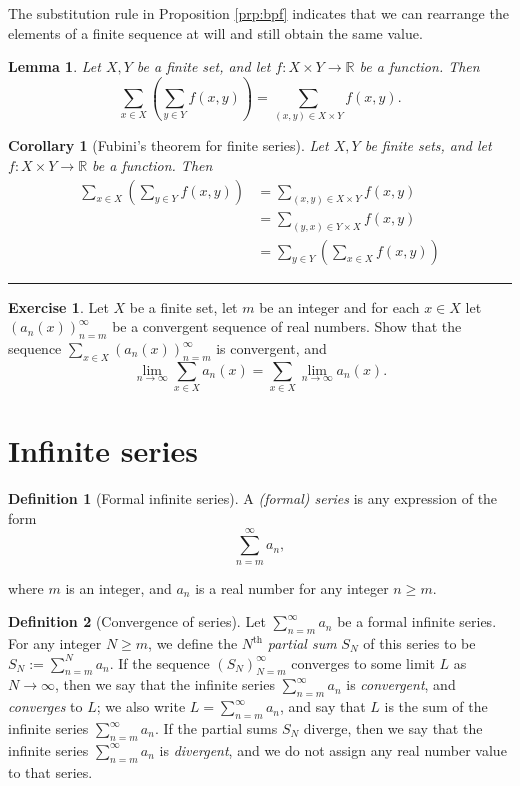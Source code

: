 \documentclass[
]{book}
\newtheorem{lemma}{Lemma}[chapter]
\newtheorem{corollary}{Corollary}[chapter]
\theoremstyle{definition}
\newtheorem{definition}{Definition}[chapter]
\theoremstyle{definition}
\theoremstyle{definition}
\newtheorem{exercise}{Exercise}[chapter]
\theoremstyle{definition}
\theoremstyle{remark}
\begin{document}
The substitution rule in Proposition \ref{prp:bpf} indicates that we can rearrange the elements of a finite sequence at will and still obtain the same value.

\begin{lemma}
Let \(X,Y\) be a finite set, and let \(f:X\times Y\to \mathbb{R}\) be a function. Then
\[
\sum_{x\in X}\left(\sum_{y\in Y}f(x,y)\right) = \sum_{(x,y)\in X\times Y}f(x,y).
\]
\end{lemma}

\begin{corollary}[Fubini's theorem for finite series]
Let \(X,Y\) be finite sets, and let \(f:X\times Y\to \mathbb{R}\) be a function. Then
\[
\begin{aligned}
\sum_{x\in X}\left(\sum_{y\in Y}f(x,y)\right) &= \sum_{(x,y)\in X\times Y}f(x,y)\\
&= \sum_{(y,x)\in Y\times X}f(x,y)\\
&=\sum_{y\in Y}\left(\sum_{x\in X}f(x,y)\right)
\end{aligned}
\]
\end{corollary}

\begin{center}\rule{0.5\linewidth}{0.5pt}\end{center}

\begin{exercise}
Let \(X\) be a finite set, let \(m\) be an integer and for each \(x\in X\) let \((a_n(x))_{n=m}^{\infty}\) be a convergent sequence of real numbers. Show that the sequence \(\sum_{x\in X}(a_n(x))_{n=m}^{\infty}\) is convergent, and
\[
\lim_{n\to \infty}\sum_{x\in X}a_n(x)=\sum_{x\in X}\lim_{n\to \infty}a_n(x).
\]
\end{exercise}

\section{Infinite series}\label{infinite-series}

\begin{definition}[Formal infinite series]
A \emph{(formal) series} is any expression of the form
\[
\sum_{n=m}^{\infty}a_n,
\]
\end{definition}

where \(m\) is an integer, and \(a_n\) is a real number for any integer \(n\geq m\).

\begin{definition}[Convergence of series]
Let \(\sum_{n=m}^{\infty}a_n\) be a formal infinite series. For any integer \(N \geq m\), we define the \(N^{\text{th}}\) \emph{partial sum} \(S_N\) of this series to be \(S_N:=\sum_{n=m}^Na_n\). If the sequence \((S_N)^{\infty}_{N=m}\) converges to some limit \(L\) as \(N\to\infty\), then we say that the infinite series \(\sum_{n=m}^{\infty}a_n\) is \emph{convergent}, and \emph{converges} to \(L\); we also write \(L=\sum_{n=m}^{\infty}a_n\), and say that \(L\) is the sum of the infinite series \(\sum_{n=m}^{\infty}a_n\). If the partial sums \(S_N\) diverge, then we say that the infinite series \(\sum_{n=m}^{\infty}a_n\) is \emph{divergent}, and we do not assign any real number value to that series.
\end{definition}
\end{document}
